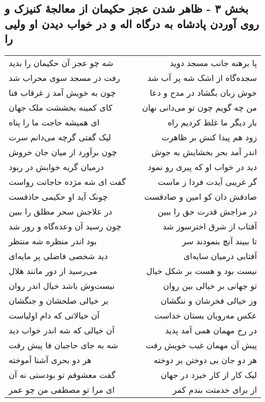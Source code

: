 \begin{center}
\section*{بخش ۳ - ظاهر شدن عجز حکیمان از معالجهٔ کنیزک و روی آوردن پادشاه به درگاه اله و در خواب دیدن او ولیی را}
\label{sec:sh003}
\begin{longtable}{l p{0.5cm} r}
شه چو عجز آن حکیمان را بدید
&&
پا برهنه جانب مسجد دوید
\\
رفت در مسجد سوی محراب شد
&&
سجده‌گاه از اشک شه پر آب شد
\\
چون به خویش آمد ز غرقاب فنا
&&
خوش زبان بگشاد در مدح و دعا
\\
کای کمینه بخششت ملک جهان
&&
من چه گویم چون تو می‌دانی نهان
\\
ای همیشه حاجت ما را پناه
&&
بار دیگر ما غلط کردیم راه
\\
لیک گفتی گرچه می‌دانم سرت
&&
زود هم پیدا کنش بر ظاهرت
\\
چون برآورد از میان جان خروش
&&
اندر آمد بحر بخشایش به جوش
\\
درمیان گریه خوابش در ربود
&&
دید در خواب او که پیری رو نمود
\\
گفت ای شه مژده حاجاتت رواست
&&
گر غریبی آیدت فردا ز ماست
\\
چونک آید او حکیمی حاذقست
&&
صادقش دان کو امین و صادقست
\\
در علاجش سحر مطلق را ببین
&&
در مزاجش قدرت حق را ببین
\\
چون رسید آن وعده‌گاه و روز شد
&&
آفتاب از شرق اخترسوز شد
\\
بود اندر منظره شه منتظر
&&
تا ببیند آنچ بنمودند سر
\\
دید شخصی فاضلی پر مایه‌ای
&&
آفتابی درمیان سایه‌ای
\\
می‌رسید از دور مانند هلال
&&
نیست بود و هست بر شکل خیال
\\
نیست‌وش باشد خیال اندر روان
&&
تو جهانی بر خیالی بین روان
\\
بر خیالی صلحشان و جنگشان
&&
وز خیالی فخرشان و ننگشان
\\
آن خیالاتی که دام اولیاست
&&
عکس مه‌رویان بستان خداست
\\
آن خیالی که شه اندر خواب دید
&&
در رخ مهمان همی آمد پدید
\\
شه به جای حاجبان فا پیش رفت
&&
پیش آن مهمان غیب خویش رفت
\\
هر دو بحری آشنا آموخته
&&
هر دو جان بی دوختن بر دوخته
\\
گفت معشوقم تو بودستی نه آن
&&
لیک کار از کار خیزد در جهان
\\
ای مرا تو مصطفی من چو عمر
&&
از برای خدمتت بندم کمر
\\
\end{longtable}
\end{center}
